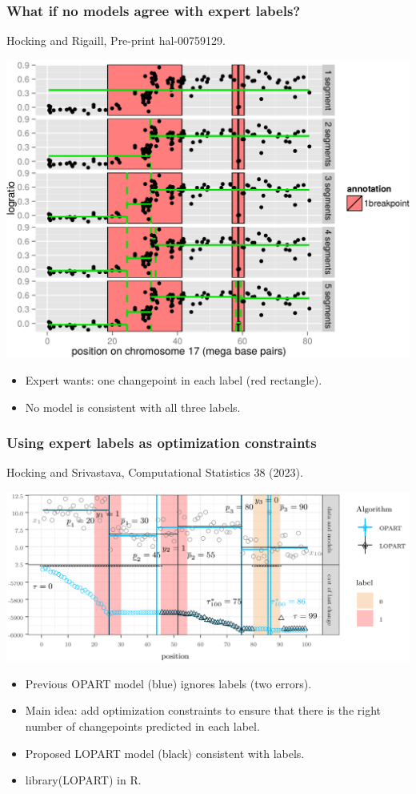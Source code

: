 \documentclass{beamer}
\begin{document}
\begin{frame}
  \frametitle{What if no models agree with expert labels?}
  Hocking and Rigaill, Pre-print hal-00759129.

  \includegraphics[width=0.8\linewidth]{SegAnnot-motivation}

  \begin{itemize}
  \item Expert wants: one changepoint in each label (red rectangle).
  \item No model is consistent with all three labels.
  \end{itemize}
\end{frame}

\begin{frame}
  \frametitle{Using expert labels as optimization constraints}
  Hocking and Srivastava, Computational Statistics 38 (2023).

  \includegraphics[width=\linewidth]{LOPART-notation}

  \begin{itemize}
  \item Previous OPART model (blue) ignores labels (two errors).
  \item Main idea: add optimization constraints to ensure that there
    is the right number of changepoints predicted in each label.
  \item Proposed LOPART model (black) consistent with labels.
  \item library(LOPART) in R.
  \end{itemize}
\end{frame}
\end{document}

